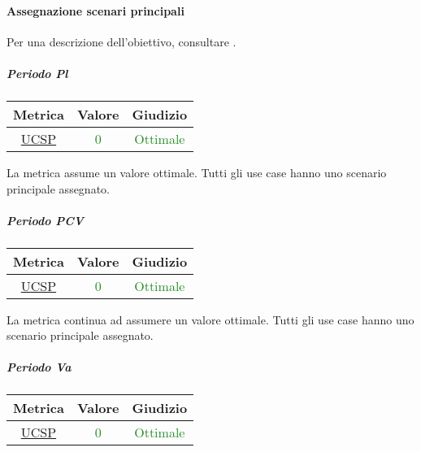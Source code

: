 				\newpage
				
				\paragraph{Assegnazione scenari principali}
					Per una descrizione dell'obiettivo, consultare .
					\subparagraph{Periodo Pl}
					
					\begin{table}[H]
						\centering
						\begin{tabular}{  c | c | c}
							\hline
							\textbf{Metrica} & \textbf{Valore} & \textbf{Giudizio} \\
							\hline
						\hyperref[MMC]{UCSP}   & \textcolor{ForestGreen}{0}          & \textcolor{ForestGreen}{Ottimale} \\ \hline
						\end{tabular} 
					\end{table}
				
					La metrica assume un valore ottimale. Tutti gli use case hanno uno scenario principale assegnato.
					
					\subparagraph{Periodo PCV}
					
					\begin{table}[H]
						\centering
						\begin{tabular}{  c | c | c}
							\hline
							\textbf{Metrica} & \textbf{Valore} & \textbf{Giudizio} \\
							\hline
							\hyperref[MMC]{UCSP}   & \textcolor{ForestGreen}{0}          & \textcolor{ForestGreen}{Ottimale} \\ \hline
						\end{tabular} 
					\end{table}
					
					La metrica continua ad assumere un valore ottimale. Tutti gli use case hanno uno scenario principale assegnato.
				
				\subparagraph{Periodo Va}
				
				\begin{table}[H]
					\centering
					\begin{tabular}{  c | c | c}
						\hline
						\textbf{Metrica} & \textbf{Valore} & \textbf{Giudizio} \\
						\hline
						\hyperref[MMC]{UCSP}   & \textcolor{ForestGreen}{0}          & \textcolor{ForestGreen}{Ottimale} \\ \hline
					\end{tabular} 
				\end{table}
				
